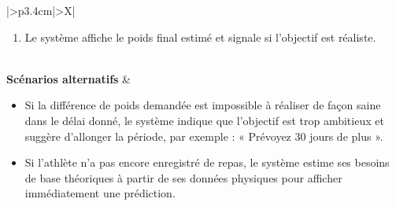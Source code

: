 \documentclass[a4paper,12pt]{report}
\begin{document}
\begin{table}[H]
\begin{tabularx}{\textwidth}{|>{\RaggedRight\arraybackslash}p{3.4cm}|>{\RaggedRight\arraybackslash}X|}
\begin{minipage}[t]{\linewidth}
\begin{enumerate}[label=\arabic*., leftmargin=*, topsep=0pt, itemsep=1pt]
    \item Le système affiche le poids final estimé et signale si l'objectif est réaliste.
\end{enumerate}
\vspace{2pt}
\end{minipage} \\
\hline
\textbf{Scénarios alternatifs} &
\begin{minipage}[t]{\linewidth}
\vspace{2pt}
\begin{itemize}[leftmargin=*, topsep=0pt, itemsep=1pt]
    \item Si la différence de poids demandée est impossible à réaliser de façon saine dans le délai donné, le système indique que l'objectif est trop ambitieux et suggère d'allonger la période, par exemple : « Prévoyez 30 jours de plus ».
    \item Si l'athlète n'a pas encore enregistré de repas, le système estime ses besoins de base théoriques à partir de ses données physiques pour afficher immédiatement une prédiction.
\end{itemize}
\vspace{2pt}
\end{minipage} \\
\hline
\end{tabularx}
\fussy
\end{table}
\end{document}
